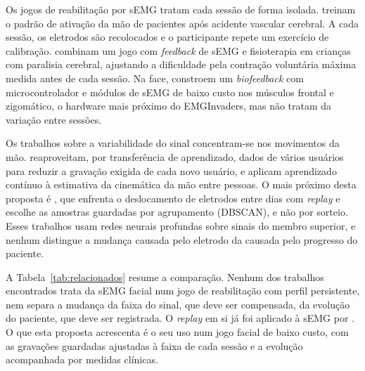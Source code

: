 \documentclass[runningheads]{llncs}
\begin{document}
Os jogos de reabilitação por sEMG tratam cada sessão de forma isolada. \citet{seo2022emg} treinam o padrão de ativação da mão de pacientes após acidente vascular cerebral. A cada sessão, os eletrodos são recolocados e o participante repete um exercício de calibração. \citet{boulay2024serious} combinam um jogo com \textit{feedback} de sEMG e fisioterapia em crianças com paralisia cerebral, ajustando a dificuldade pela contração voluntária máxima medida antes de cada sessão. Na face, \citet{machetanz2022facial} constroem um \textit{biofeedback} com microcontrolador e módulos de sEMG de baixo custo nos músculos frontal e zigomático, o hardware mais próximo do EMGInvaders, mas não tratam da variação entre sessões.

Os trabalhos sobre a variabilidade do sinal concentram-se nos movimentos da mão. \citet{coteallard2019transfer} reaproveitam, por transferência de aprendizado, dados de vários usuários para reduzir a gravação exigida de cada novo usuário, e \citet{chen2024lifelong} aplicam aprendizado contínuo à estimativa da cinemática da mão entre pessoas. O mais próximo desta proposta é \citet{zhang2024replay}, que enfrenta o deslocamento de eletrodos entre dias com \textit{replay} e escolhe as amostras guardadas por agrupamento (DBSCAN), e não por sorteio. Esses trabalhos usam redes neurais profundas sobre sinais do membro superior, e nenhum distingue a mudança causada pelo eletrodo da causada pelo progresso do paciente.

A Tabela~\ref{tab:relacionados} resume a comparação. Nenhum dos trabalhos encontrados trata da sEMG facial num jogo de reabilitação com perfil persistente, nem separa a mudança da faixa do sinal, que deve ser compensada, da evolução do paciente, que deve ser registrada. O \textit{replay} em si já foi aplicado à sEMG por \citet{zhang2024replay}. O que esta proposta acrescenta é o seu uso num jogo facial de baixo custo, com as gravações guardadas ajustadas à faixa de cada sessão e a evolução acompanhada por medidas clínicas.
\end{document}
